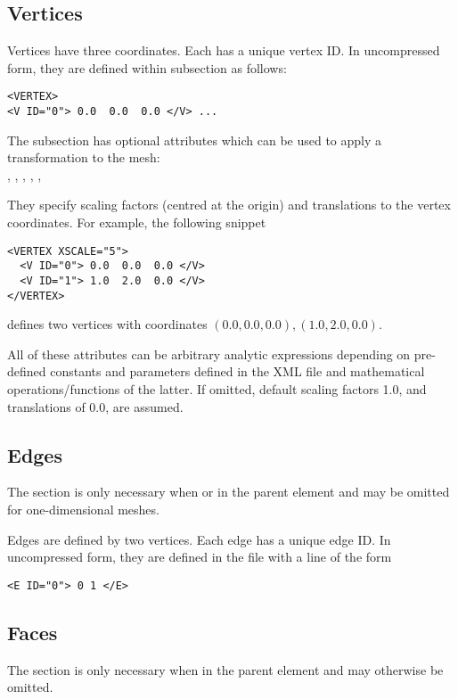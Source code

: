 \subsection{Vertices}

Vertices have three coordinates. Each has a unique vertex ID. In
uncompressed form, they are defined within  subsection as follows:
\begin{lstlisting}[style=XMLStyle] <VERTEX>
<V ID="0"> 0.0  0.0  0.0 </V> ...
\end{lstlisting}
The  subsection has optional attributes which can be used to
apply a transformation to the mesh:\\
, , ,
, , 

They specify scaling factors (centred at the origin) and translations to the
vertex coordinates. For example, the following snippet
\begin{lstlisting}[style=XMLStyle]
<VERTEX XSCALE="5">
  <V ID="0"> 0.0  0.0  0.0 </V>
  <V ID="1"> 1.0  2.0  0.0 </V>
</VERTEX>
\end{lstlisting}
defines two vertices with coordinates $(0.0,0.0,0.0), (1.0,2.0,0.0)$.

All of these attributes can be arbitrary analytic expressions depending on pre-
defined constants and parameters defined in the XML file and
mathematical operations/functions of the latter. If omitted, default scaling
factors 1.0, and translations of 0.0, are assumed.



\subsection{Edges}
\begin{tipbox}
    The  section is only necessary when  or
     in the parent  element and may be omitted for
    one-dimensional meshes.
\end{tipbox}

Edges are defined by two vertices. Each edge has a unique edge ID. In
uncompressed form, they are defined in the file with a line of the form
\begin{lstlisting}[style=XMLStyle]
<E ID="0"> 0 1 </E>
\end{lstlisting}


\subsection{Faces}
\begin{tipbox}
    The  section is only necessary when  in the
    parent  element and may otherwise be omitted.
\end{tipbox}

